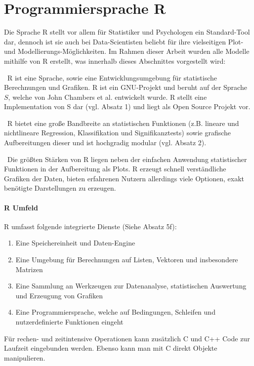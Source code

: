 \section{Programmiersprache R}
\label{sec:R}
Die Sprache R stellt vor allem für Statistiker und Psychologen ein Standard-Tool dar, dennoch ist sie auch bei Data-Scientisten beliebt für ihre vielseitigen Plot- und Modellierungs-Möglichkeiten. Im Rahmen dieser Arbeit wurden alle Modelle mithilfe von R erstellt, was innerhalb dieses Abschnittes vorgestellt wird:

~\newline R ist eine Sprache, sowie eine Entwicklungsumgebung für statistische Berechnungen und Grafiken. R ist ein GNU-Projekt und beruht auf der Sprache $S$, welche von John Chambers et al. entwickelt wurde. R stellt eine Implementation von S dar (vgl. \cite{RProject} Absatz 1) und liegt als Open Source Projekt vor.

~\newline R bietet eine große Bandbreite an statistischen Funktionen (z.B. lineare und nichtlineare Regression, Klassifikation und Signifikanztests) sowie grafische Aufbereitungen dieser und ist hochgradig modular (vgl. \cite{RProject} Absatz 2). 

~\newline Die größten Stärken von R liegen neben der einfachen Anwendung statistischer Funktionen in der Aufbereitung als Plots. R erzeugt schnell verständliche Grafiken der Daten, bieten erfahrenen Nutzern allerdings viele Optionen, exakt benötigte Darstellungen zu erzeugen. 

\paragraph{ R Umfeld} 
R umfasst folgende integrierte Dienste (Siehe \cite{RProject} Absatz 5f):
\begin{enumerate}
	\item Eine Speichereinheit und Daten-Engine
	\item Eine Umgebung für Berechnungen auf Listen, Vektoren und insbesondere Matrizen
	\item Eine Sammlung an Werkzeugen zur Datenanalyse, statistischen Auswertung und Erzeugung von Grafiken
	\item Eine Programmiersprache, welche auf Bedingungen, Schleifen und nutzerdefinierte Funktionen eingeht
\end{enumerate}

Für rechen- und zeitintensive Operationen kann zusätzlich C und C++ Code zur Laufzeit eingebunden werden. Ebenso kann man mit C direkt Objekte manipulieren. 


